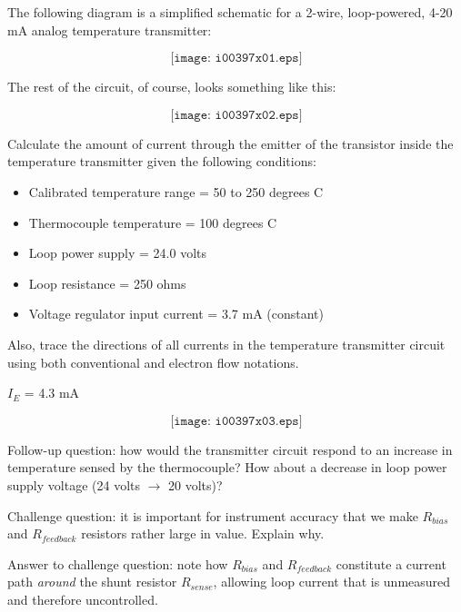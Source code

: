 

The following diagram is a simplified schematic for a 2-wire, loop-powered, 4-20 mA analog temperature transmitter:

$$\texttt{[image: i00397x01.eps]}$$

\vskip 10pt

The rest of the circuit, of course, looks something like this:

$$\texttt{[image: i00397x02.eps]}$$

Calculate the amount of current through the emitter of the transistor inside the temperature transmitter given the following conditions:

\begin{itemize}
\item{} Calibrated temperature range = 50 to 250 degrees C
\item{} Thermocouple temperature = 100 degrees C
\item{} Loop power supply = 24.0 volts
\item{} Loop resistance = 250 ohms
\item{} Voltage regulator input current = 3.7 mA (constant)
\end{itemize}

Also, trace the directions of all currents in the temperature transmitter circuit using both conventional and electron flow notations.







$I_E$ = 4.3 mA

$$\texttt{[image: i00397x03.eps]}$$

\vskip 10pt

Follow-up question: how would the transmitter circuit respond to an increase in temperature sensed by the thermocouple?  How about a decrease in loop power supply voltage (24 volts $\to$ 20 volts)?

\vskip 10pt

Challenge question: it is important for instrument accuracy that we make $R_{bias}$ and $R_{feedback}$ resistors rather large in value.  Explain why.







Answer to challenge question: note how $R_{bias}$ and $R_{feedback}$ constitute a current path {\it around} the shunt resistor $R_{sense}$, allowing loop current that is unmeasured and therefore uncontrolled.




